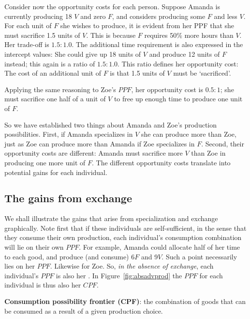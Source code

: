 Consider now the opportunity costs for each person. Suppose Amanda is
currently producing 18 $V$ and zero $F$, and considers producing some $F$
and less $V$. For each unit of $F$ she wishes to produce, it is evident from
her PPF that she must sacrifice 1.5 units of $V$. This is because $F$
requires 50\% more hours than $V$. Her trade-off is $1.5:1.0$. The
additional time requirement is also expressed in the intercept values: She
could give up 18 units of $V$ and produce 12 units of $F$ instead; this
again is a ratio of $1.5:1.0$. This ratio defines her opportunity cost:
The cost of an additional unit of $F$ is that 1.5 units of $V$ must be
`sacrificed'.

Applying the same reasoning to Zoe's $PPF$, her opportunity cost is $0.5:1$;
she must sacrifice one half of a unit of $V$ to free up enough time to
produce one unit of $F$. 

So we have established two things about Amanda and Zoe's production
possibilities. First, if Amanda specializes in $V$ she can produce more than
Zoe, just as Zoe can produce more than Amanda if Zoe specializes in $F$.
Second, their opportunity costs are different: Amanda must sacrifice more $V$
than Zoe in producing one more unit of $F$. The different opportunity costs
translate into potential gains for each individual.

\newhtmlpage

\subsection*{The gains from exchange}

We shall illustrate the gains that arise from specialization and exchange
graphically. Note first that if these individuals are self-sufficient, in
the sense that they consume their own production, each individual's
consumption combination will lie on their own $PPF$. For example, Amanda
could allocate half of her time to each good, and produce (and consume) 6$F$
and 9$V$. Such a point necessarily lies on her $PPF$. Likewise for Zoe. So, 
\textit{in the absence of exchange}, each individual's $PPF$ is also her %
. In Figure~\ref{fig:absadvprod} 
the $PPF$ for each individual is thus also her $CPF$.

\begin{DefBox}
	\textbf{Consumption possibility frontier (CPF)}: the combination of goods that can be consumed as a result of a given production choice.
\end{DefBox}

